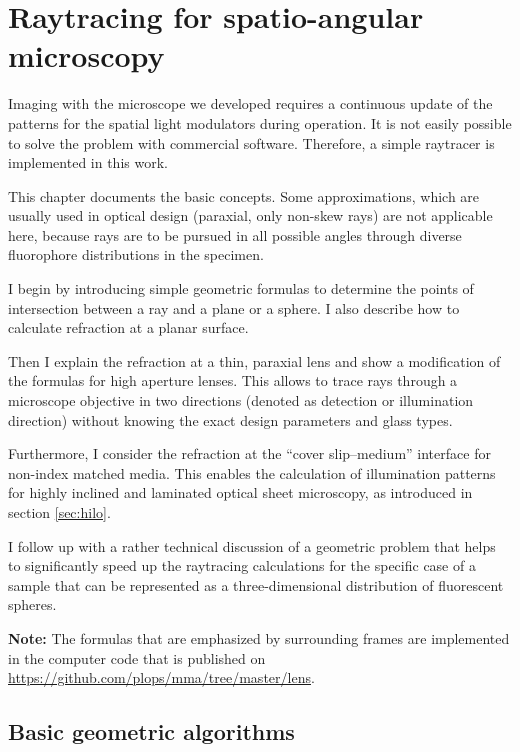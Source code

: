 \chapter{Raytracing for spatio-angular microscopy}
\label{sec:raytrace}
\renewcommand{\i}{\nvect i}
\begin{summary}
  Imaging with the microscope we developed requires a continuous
  update of the patterns for the spatial light modulators during
  operation. It is not easily possible to solve the problem with
  commercial software. Therefore, a simple raytracer is implemented in
  this work.

  This chapter documents the basic concepts. Some approximations,
  which are usually used in optical design (paraxial, only non-skew
  rays) are not applicable here, because rays are to be pursued in all
  possible angles through diverse fluorophore distributions in the
  specimen.

  I begin by introducing simple geometric formulas to determine the
  points of intersection between a ray and a plane or a sphere. I also
  describe how to calculate refraction at a planar surface.

  Then I explain the refraction at a thin, paraxial lens and show a
  modification of the formulas for high aperture lenses. This allows
  to trace rays through a microscope objective in two directions
  (denoted as detection or illumination direction) without knowing the
  exact design parameters and glass types.

  Furthermore, I consider the refraction at the ``cover slip--medium''
  interface for non-index matched media. This enables the calculation
  of illumination patterns for highly inclined and laminated optical
  sheet microscopy, as introduced in section \ref{sec:hilo}.

  I follow up with a rather technical discussion of a geometric
  problem that helps to significantly speed up the raytracing
  calculations for the specific case of a sample that can be
  represented as a three-dimensional distribution of fluorescent
  spheres.

  {\bf Note:} The formulas that are emphasized by surrounding frames
  are implemented in the computer code that is published on
  \url{https://github.com/plops/mma/tree/master/lens}.
\end{summary}
\section{Basic geometric algorithms}
